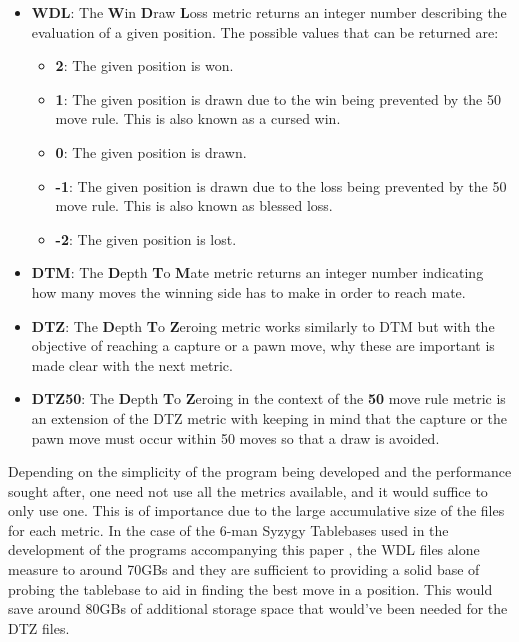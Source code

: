 \begin{itemize}
    \item \textbf{WDL}: The \textbf{W}in \textbf{D}raw \textbf{L}oss metric returns an integer number describing the evaluation of a given position. The possible values that can be returned are:
        \begin{itemize}
            \item \textbf{2}: The given position is won.
            \item \textbf{1}: The given position is drawn due to the win being prevented by the 50 move rule. This is also known as a cursed win.
            \item \textbf{0}: The given position is drawn.
            \item \textbf{-1}: The given position is drawn due to the loss being prevented by the 50 move rule. This is also known as blessed loss.
            \item \textbf{-2}: The given position is lost.
        \end{itemize}
    \item \textbf{DTM}: The \textbf{D}epth \textbf{T}o \textbf{M}ate metric returns an integer number indicating how many moves the winning side has to make in order to reach mate.
    \item \textbf{DTZ}: The \textbf{D}epth \textbf{T}o \textbf{Z}eroing metric works similarly to DTM but with the objective of reaching a capture or a pawn move, why these are important is made clear with the next metric.
    \item \textbf{DTZ50}: The \textbf{D}epth \textbf{T}o \textbf{Z}eroing in the context of the \textbf{50} move rule metric is an extension of the DTZ metric with keeping in mind that the capture or the pawn move must occur within 50 moves so that a draw is avoided.
\end{itemize}

Depending on the simplicity of the program being developed and the performance sought after, one need not use all the metrics available, and it would suffice to only use one. This is of importance due to the large accumulative size of the files for each metric. In the case of the 6-man Syzygy Tablebases used in the development of the programs accompanying this paper \cite{NeuralBases}, the WDL files alone measure to around 70GBs and they are sufficient to providing a solid base of probing the tablebase to aid in finding the best move in a position. This would save around 80GBs of additional storage space that would've been needed for the DTZ files.

